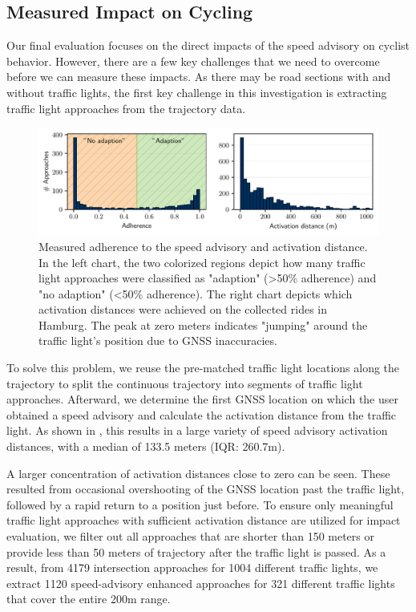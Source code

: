\subsection{Measured Impact on Cycling}

Our final evaluation focuses on the direct impacts of the speed advisory on cyclist behavior. However, there are a few key challenges that we need to overcome before we can measure these impacts. As there may be road sections with and without traffic lights, the first key challenge in this investigation is extracting traffic light approaches from the trajectory data. 

\begin{figure}[t]
\caption{Measured adherence to the speed advisory and activation distance. In the left chart, the two colorized regions depict how many traffic light approaches were classified as "adaption" (>50\% adherence) and "no adaption" (<50\% adherence). The right chart depicts which activation distances were achieved on the collected rides in Hamburg. The peak at zero meters indicates "jumping" around the traffic light's position due to GNSS inaccuracies.}\label{fig:impacts-adherence-activation-distance}
\includegraphics[width=\linewidth]{images/impacts-adherence-activation-distance.pdf}
\end{figure}

To solve this problem, we reuse the pre-matched traffic light locations along the trajectory to split the continuous trajectory into segments of traffic light approaches. Afterward, we determine the first GNSS location on which the user obtained a speed advisory and calculate the activation distance from the traffic light. As shown in , this results in a large variety of speed advisory activation distances, with a median of 133.5 meters (IQR: 260.7m). 

A larger concentration of activation distances close to zero can be seen. These resulted from occasional overshooting of the GNSS location past the traffic light, followed by a rapid return to a position just before. To ensure only meaningful traffic light approaches with sufficient activation distance are utilized for impact evaluation, we filter out all approaches that are shorter than 150 meters or provide less than 50 meters of trajectory after the traffic light is passed. As a result, from 4179 intersection approaches for 1004 different traffic lights, we extract 1120 speed-advisory enhanced approaches for 321 different traffic lights that cover the entire 200m range.

